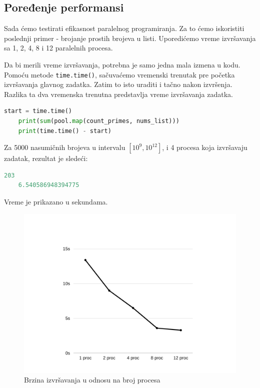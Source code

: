 \documentclass[a4paper]{article}
\begin{document}
    \subsection{Poređenje performansi}
    Sada ćemo testirati efikasnost paralelnog programiranja. Za to ćemo iskoristiti poslednji primer - brojanje prostih brojeva u listi. Uporedićemo vreme izvršavanja sa 1, 2, 4, 8 i 12 paralelnih procesa.
    \par Da bi merili vreme izvršavanja, potrebna je samo jedna mala izmena u kodu. Pomoću metode \lstinline{time.time()}, sačuvaćemo vremenski trenutak pre početka izvršavanja glavnog zadatka. Zatim to isto uraditi i tačno nakon izvršenja. Razlika ta dva vremenska trenutna predstavlja vreme izvršavanja zadatka.
    \begin{lstlisting}[showstringspaces=false, language=Python]
    start = time.time()
    print(sum(pool.map(count_primes, nums_list)))
    print(time.time() - start)
    \end{lstlisting}
    Za 5000 nasumičnih brojeva u intervalu $\left [ 10^{9}, 10^{12} \right ]$, i 4 procesa koja izvršavaju zadatak, rezultat je sledeći:
    \begin{lstlisting}[showstringspaces=false, language=Python]
    203
    6.540586948394775
    \end{lstlisting}
    \par Vreme je prikazano u sekundama. \\
  
    \begin{figure}[ht!]
    \begin{center}
    \includegraphics[scale=0.3]{grafik.png}
    \end{center}
    \caption{Brzina izvršavanja u odnosu na broj procesa}
    \label{fig:grafik}
    \end{figure}
    
\end{document}

